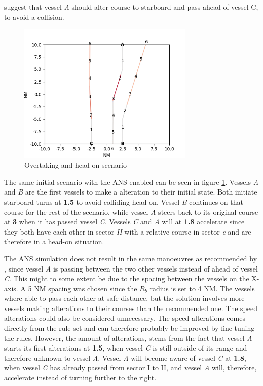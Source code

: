 \textcite{ecolreg_overtaking-and-head-on} suggest that vessel \textit{A} should alter course to starboard and pass ahead of vessel C,  to avoid a collision.



\begin{figure}[H]
    \centering
    \includegraphics[width=0.75\textwidth,height=0.75\textheight,keepaspectratio]{../src/img/overtaking_head_on_res.png}
    \caption{Overtaking and head-on scenario  }
    \label{fig:overtaking-and-head-on-res}
\end{figure}
The same initial scenario with the ANS enabled can be seen in figure \ref{fig:overtaking-and-head-on-res}. Vessels \textit{A} and \textit{B} are the first vessels to make a alteration to their initial state. Both initiate starboard turns   at \textbf{1.5} to avoid colliding head-on. Vessel \textit{B} continues on that course for the rest of the scenario, while vessel \textit{A} steers back to its original course at \textbf{3} when it has passed vessel \textit{C}. Vessels \textit{C} and \textit{A} will at \textbf{1.8} accelerate since they both have each other in sector \textit{II} with a relative course in sector \textit{e} and are therefore in a head-on situation.

The ANS simulation does not result in the same manoeuvres as recommended by \textcite{ecolreg_overtaking-and-head-on}, since vessel \textit{A} is passing between the two other vessels instead of ahead of vessel \textit{C}. This might to some extent be due to the spacing between the vessels on the X-axis. A 5 NM spacing was chosen since the $R_b$ radius is set to 4 NM. The vessels where able to pass each other at safe distance, but the solution involves  more vessels making alterations to their courses than the recommended one. The speed alterations could also be considered unnecessary. The speed alterations comes directly from the rule-set and can therefore probably be improved by fine tuning the rules. However, the amount of alterations, stems from the fact that vessel \textit{A} starts its first alterations at \textbf{1.5}, when vessel \textit{C} is still outside of its range and therefore unknown to vessel \textit{A}. Vessel \textit{A} will become aware of vessel \textit{C} at \textbf{1.8}, when vessel \textit{C} has already passed from sector I to II, and vessel \textit{A} will, therefore, accelerate instead of turning further to the right.

